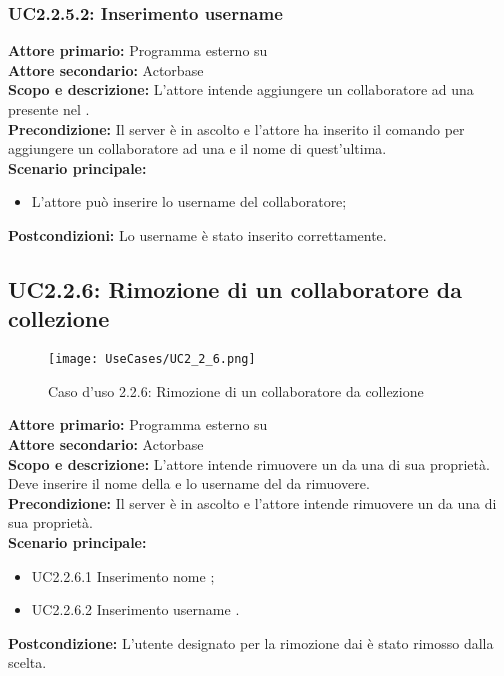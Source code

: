 \documentclass{scalatekids-article}
\begin{document}
\subsubsection{UC2.2.5.2: Inserimento username}

\textbf{Attore primario:} Programma esterno su \\
\textbf{Attore secondario:} Actorbase\\
\textbf{Scopo e descrizione:} L’attore intende aggiungere un collaboratore ad una  presente nel .\\
\textbf{Precondizione:} Il server è in ascolto e l’attore ha inserito il comando per aggiungere un collaboratore ad una  e il nome di quest'ultima.\\
\textbf{Scenario principale:}
\begin{itemize}
\item L'attore può inserire lo username del collaboratore;
\end{itemize}
\textbf{Postcondizioni:} Lo username è stato inserito correttamente.

\subsection{UC2.2.6: Rimozione di un collaboratore da collezione}

\begin{figure}[H]
  \begin{center}
    \texttt{[image: UseCases/UC2\_2\_6.png]}
    \caption*{Caso d'uso 2.2.6: Rimozione di un collaboratore da collezione}
  \end{center}
\end{figure}
\textbf{Attore primario:} Programma esterno su \\
\textbf{Attore secondario:} Actorbase\\
\textbf{Scopo e descrizione:} L'attore intende rimuovere un  da una  di sua proprietà. Deve inserire il nome della  e lo username del  da rimuovere.\\
\textbf{Precondizione:} Il server è in ascolto e l'attore intende rimuovere un  da una  di sua proprietà.\\
\textbf{Scenario principale:}
\begin{itemize}
\item UC2.2.6.1 Inserimento nome ;
\item UC2.2.6.2 Inserimento username .
\end{itemize}
\textbf{Postcondizione:} L'utente designato per la rimozione dai  è stato rimosso dalla  scelta.
\end{document}

